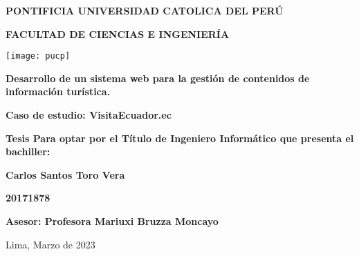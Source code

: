 \begin{titlepage}
    \begin{center}
        \vspace*{1cm}
        \Large
        \textbf{PONTIFICIA UNIVERSIDAD CATOLICA DEL PERÚ}

        \vspace{0.5cm}
        \textbf{FACULTAD DE CIENCIAS E INGENIERÍA}

        \vspace{0.5cm}
        \texttt{[image: pucp]}

        \vspace{1.5cm}
        \textbf{Desarrollo de un sistema web para la gestión de contenidos de información turística.}

        \textbf{Caso de estudio: VisitaEcuador.ec}

        \normalsize
        \vspace{3.5cm}
        \textbf{Tesis Para optar por el Título de Ingeniero Informático que presenta el bachiller:}

        \Large
        \vspace{1.5cm}
        \textbf{Carlos Santos Toro Vera}

        \vspace{0.3cm}
        \textbf{20171878}

        \vspace{3cm}
        \textbf{Asesor: Profesora Mariuxi Bruzza Moncayo}

        \normalsize
        \vspace{3cm}
        {Lima, Marzo de 2023}
    \end{center}
\end{titlepage}

